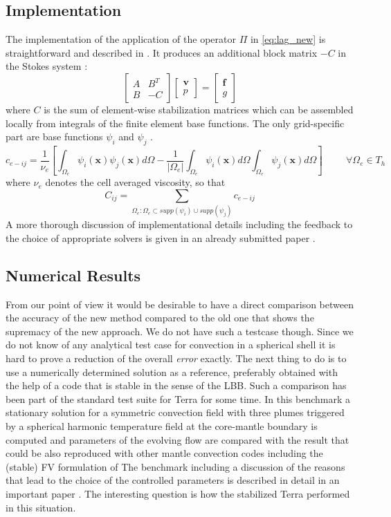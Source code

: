 \documentclass[times]{fldauth}
\newcommand{\mb}{\mathbf}
\begin{document}
\subsection{Implementation}
The implementation of the  application of the operator $\Pi$ in \eqref{eq:lag_new} 
is straightforward and described in \cite{Dohrmann2004}.
It produces an additional block matrix $-C$ in the Stokes system :
\[
\left[
\begin{array}{cc}
 A & B^T\\
 B & -C
\end{array}
\right]
\left[
\begin{array}{c}
 \mb v \\
 p
\end{array}
\right]
=
\left[
\begin{array}{c}
 \mb f \\
 g
\end{array}
\right]
\]
where $C$ 
is the sum of element-wise stabilization matrices which can be assembled locally from integrals of the finite element base functions.
The only grid-specific part are base functions $\psi_i$ and $\psi_j$ .
\[
c_{e-{ij}}=\frac{1}{\nu_e}
\left[
\int_{\Omega_{e}} \psi_i(\mb x) \psi_j(\mb x) d\Omega -\frac{1}{|\Omega_e|} \int_{\Omega_{e}} \psi_i(\mb x) d\Omega \int_{\Omega_{e}} \psi_j(\mb x)  d\Omega
\right]
 \hspace{1cm} \forall \Omega_e \in T_h
\]
where $\nu_e$ denotes the cell averaged viscosity,
so that
\[
C_{ij}= \sum_{
   \Omega_e : \Omega_e \subset supp(\psi_i) \cup supp(\psi_j)
   } 
   c_{e-{ij}}
\]
A more thorough discussion of implementational details including the feedback to the choice of appropriate solvers is given in an already submitted paper \cite{Koestler2012}.
\subsection{Numerical Results}
From our point of view it would be desirable to have a direct comparison between  the accuracy of the new method compared to the old one that shows the supremacy of the new approach.
We do not have such a testcase though. 
Since we do not know of any analytical test case for convection in a spherical shell it is hard to prove a reduction of the overall \emph{error} exactly. 
The next thing to do is to use a numerically determined solution as a reference, preferably obtained with the help of a code that is stable in the sense of the LBB.
Such a comparison has been part of the standard test suite for Terra for some time.
In this benchmark a stationary solution for a symmetric convection field with three plumes triggered by a spherical harmonic temperature field at the core-mantle boundary is computed and parameters of the evolving flow are compared with the result that could be also reproduced with other mantle convection codes including the (stable) FV formulation of \cite{Harder2005}
The benchmark including a discussion of the reasons that lead to the choice of the controlled parameters is described in detail in an important paper \cite{Stemmer2006}. 
The interesting question is how the stabilized Terra performed in this situation.
\end{document}
